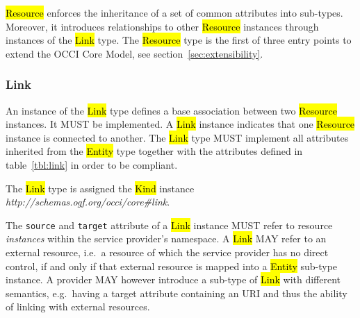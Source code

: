 \documentclass[10pt,a4paper]{article}
\begin{document}
\hl{Resource} enforces the inheritance of a set of common attributes into
sub-types. Moreover, it introduces relationships to other \hl{Resource}
instances through instances of the \hl{Link} type.
%
The \hl{Resource} type is the first of three entry points to extend the OCCI Core
Model, see section~\ref{sec:extensibility}.

\subsubsection{Link}
\label{sec:link}
An instance of the \hl{Link} type defines a base association between two
\hl{Resource} instances. It MUST be implemented. A \hl{Link} instance indicates
that one \hl{Resource} instance is connected to another.
%
The \hl{Link} type MUST implement all attributes inherited from the
\hl{Entity} type together with the attributes defined in table~\ref{tbl:link}
in order to be compliant.
%

The \hl{Link} type is assigned the \hl{Kind} instance
\textit{http://schemas.ogf.org/occi/core\#link}.
%

The {\tt source} and {\tt target} attribute of a \hl{Link} instance MUST refer
to resource {\em instances} within the service provider's namespace. A
\hl{Link} MAY refer to an external resource, i.e.~a resource of which the
service provider has no direct control, if and only if that external resource
is mapped into a \hl{Entity} sub-type instance.
%
A provider MAY however introduce a sub-type of \hl{Link} with different
semantics, e.g.~having a target attribute containing an URI and thus the
ability of linking with external resources.
\end{document}
